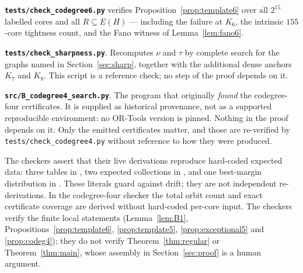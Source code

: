 \documentclass[11pt,a4paper]{amsart}
\theoremstyle{plain}
\theoremstyle{definition}
\begin{document}
\medskip
\noindent\textbf{\texttt{tests/check\_codegree6.py}}
verifies Proposition~\ref{prop:template6} over all $2^{15}$ labelled cores
and all $R\subseteq E(H)$ --- including the failure at $K_6$, the intrinsic
$155$-core tightness count, and the Fano witness of Lemma~\ref{lem:fano6}.

\medskip
\noindent\textbf{\texttt{tests/check\_sharpness.py}}.
Recomputes $\nu$ and $\tau$ by complete search for the graphs named in
Section~\ref{sec:sharp}, together with the additional dense anchors $K_7$ and
$K_8$. This script is a reference check; no step of the proof depends on it.

\medskip
\noindent\textbf{\texttt{src/B\_codegree4\_search.py}}.
The program that originally \emph{found} the codegree-four certificates. It is
supplied as historical provenance, not as a supported reproducible
environment: no OR-Tools version is pinned. Nothing in the proof depends on
it. Only the emitted certificates matter, and those are re-verified by
\texttt{tests/check\_codegree4.py} without reference to how they were
produced.

\medskip
The checkers assert that their live derivations reproduce hard-coded expected
data: three tables in , two expected
collections in , and one best-margin
distribution in . These literals guard
against drift; they are not independent re-derivations. In the codegree-four
checker the total orbit count and exact certificate coverage are derived
without hard-coded per-core input. The checkers verify the finite local statements
(Lemma~\ref{lem:B1}, Propositions~\ref{prop:template6},
\ref{prop:template5}, \ref{prop:exceptional5} and \ref{prop:codeg4}); they do
not verify Theorem~\ref{thm:regular} or Theorem~\ref{thm:main}, whose
assembly in Section~\ref{sec:proof} is a human argument.
\end{document}
